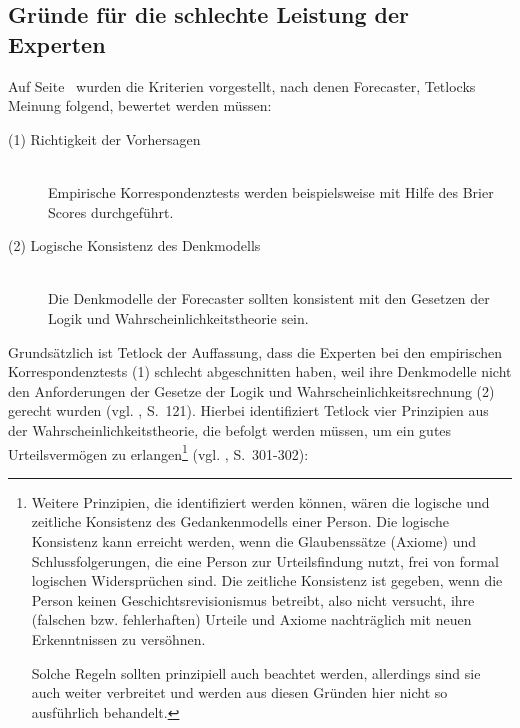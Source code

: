  
\subsection{Gründe für die schlechte Leistung der Experten}

Auf Seite~\pageref{misc:Emp_Korr} wurden die Kriterien vorgestellt, nach denen
Forecaster, Tetlocks Meinung folgend, bewertet werden müssen:

\begin{description}

\item[(1) Richtigkeit der Vorhersagen] \hfill \\
Empirische Korrespondenztests werden beispielsweise mit Hilfe des Brier Scores
durchgeführt.

\item[(2) Logische Konsistenz des Denkmodells] \hfill \\
Die Denkmodelle der Forecaster sollten konsistent mit den Gesetzen der Logik
und Wahrscheinlichkeitstheorie sein.

\end{description}

Grundsätzlich ist Tetlock der Auffassung, dass die Experten bei den empirischen
Korrespondenztests (1) schlecht abgeschnitten haben, weil ihre Denkmodelle
nicht den Anforderungen der Gesetze der Logik und Wahrscheinlichkeitsrechnung 
(2) gerecht wurden (vgl. \cite{Tetlock}, S.~121). Hierbei identifiziert Tetlock
vier Prinzipien aus der Wahrscheinlichkeitstheorie, die befolgt werden müssen,
um ein gutes Urteilsvermögen zu erlangen\footnote{
Weitere Prinzipien, die identifiziert werden können, wären die logische und
zeitliche Konsistenz des Gedankenmodells einer Person. Die logische Konsistenz
kann erreicht werden, wenn die Glaubenssätze (Axiome) und Schlussfolgerungen,
die eine Person zur Urteilsfindung nutzt, frei von formal logischen
Widersprüchen sind. Die zeitliche Konsistenz ist gegeben, wenn die Person keinen
Geschichtsrevisionismus betreibt, also nicht versucht, ihre  (falschen bzw.
fehlerhaften) Urteile und Axiome nachträglich mit neuen Erkenntnissen zu
versöhnen.

Solche Regeln sollten prinzipiell auch beachtet werden, allerdings sind sie
auch weiter verbreitet und werden aus diesen Gründen hier nicht so ausführlich
behandelt.
} (vgl. \cite{Tetlock}, S.~301-302):

